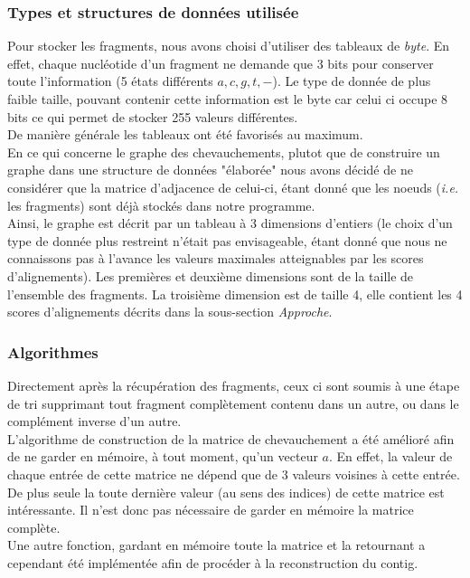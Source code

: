 \documentclass[11pt]{article}
\begin{document}
\subsubsection*{Types et structures de données utilisée}
Pour stocker les fragments, nous avons choisi d'utiliser des tableaux de \emph{byte}. En effet, chaque nucléotide d'un fragment ne demande que 3 bits pour conserver toute l'information (5 états différents ${a,c,g,t,-}$). Le type de donnée de plus faible taille, pouvant contenir cette information est le byte car celui ci occupe 8 bits ce qui permet de stocker 255 valeurs différentes.\\
De manière générale les tableaux ont été favorisés au maximum.\\[.5cm]
En ce qui concerne le graphe des chevauchements, plutot que de construire un graphe dans une structure de données "élaborée" nous avons décidé de ne considérer que la matrice d'adjacence de celui-ci, étant donné que les noeuds (\emph{i.e.} les fragments) sont déjà stockés dans notre programme.\\
Ainsi, le graphe est décrit par un tableau à 3 dimensions d'entiers (le choix d'un type de donnée plus restreint n'était pas envisageable, étant donné que nous ne connaissons pas à l'avance les valeurs maximales atteignables par les scores d'alignements). Les premières et deuxième dimensions sont de la taille de l'ensemble des fragments. La troisième dimension est de taille 4, elle contient les 4 scores d'alignements décrits dans la sous-section \emph{Approche}.\\[.5cm]
\subsubsection*{Algorithmes}
Directement après la récupération des fragments, ceux ci sont soumis à une étape de tri supprimant tout fragment complètement contenu dans un autre, ou dans le complément inverse d'un autre.\\[.5cm]
L'algorithme de construction de la matrice de chevauchement a été amélioré afin de ne garder en mémoire, à tout moment, qu'un vecteur $a$. En effet, la valeur de chaque entrée de cette matrice ne dépend que de 3 valeurs voisines à cette entrée. De plus seule la toute dernière valeur (au sens des indices) de cette matrice est intéressante. Il n'est donc pas nécessaire de garder en mémoire la matrice complète.\\
Une autre fonction, gardant en mémoire toute la matrice et la retournant a cependant été implémentée afin de procéder à la reconstruction du contig.\\
\end{document}
